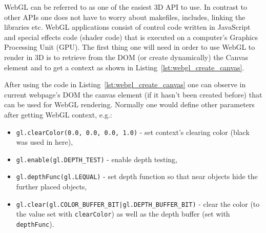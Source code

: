 WebGL can be referred to as one of the easiest 3D API to use.
In contrast to other APIs one does not have to worry about makefiles, includes, linking the libraries etc. 
WebGL applications consist of control code written in JavaScript and special effects code (shader code) that is executed on a computer's Graphics Processing Unit (GPU).
The first thing one will need in order to use WebGL to render in 3D is to retrieve from the DOM (or create dynamically) the Canvas element and to get a context as shown in Listing~\vref{lst:webgl_create_canvas}.

\begin{filecode}[language=JavaScript,label=lst:webgl_create_canvas,
caption=Create Canvas element and get the context for rendering with WebGL.]
  
\end{filecode}

After using the code in Listing~\ref{lst:webgl_create_canvas} one can observe in current webpage's DOM the canvas element (if it hasn't been created before) that can be used for WebGL rendering.
Normally one would define other parameters after getting WebGL context, e.g.:

\begin{itemize}[leftmargin=0.4cm]
\item \texttt{gl.clearColor(0.0, 0.0, 0.0, 1.0)} - set context's clearing color (black was used in here),
\item \texttt{gl.enable(gl.DEPTH\_TEST)} - enable depth testing,
\item \texttt{gl.depthFunc(gl.LEQUAL)} - set depth function so that near objects hide the further placed objects,
\item \texttt{gl.clear(gl.COLOR\_BUFFER\_BIT|gl.DEPTH\_BUFFER\_BIT)} - \newline clear the color (to the value set with \texttt{clearColor}) as well as the depth buffer (set with \texttt{depthFunc}).
\end{itemize} 


